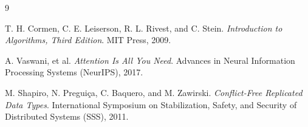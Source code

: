 \documentclass[11pt, letterpaper]{article}
\begin{document}
\begin{thebibliography}{9}

T. H. Cormen, C. E. Leiserson, R. L. Rivest, and C. Stein.
\textit{Introduction to Algorithms, Third Edition}. 
MIT Press, 2009.

A. Vaswani, et al.
\textit{Attention Is All You Need}.
Advances in Neural Information Processing Systems (NeurIPS), 2017.

M. Shapiro, N. Preguiça, C. Baquero, and M. Zawirski.
\textit{Conflict-Free Replicated Data Types}.
International Symposium on Stabilization, Safety, and Security of Distributed Systems (SSS), 2011.

\end{thebibliography}
\end{document}
